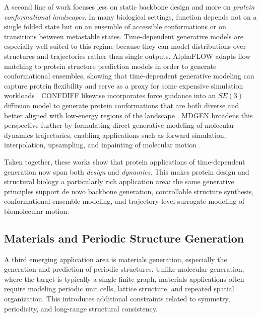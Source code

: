 \documentclass{article}
\begin{document}
A second line of work focuses less on static backbone design and more on \emph{protein conformational landscapes}. In many biological settings, function depends not on a single folded state but on an ensemble of accessible conformations or on transitions between metastable states. Time-dependent generative models are especially well suited to this regime because they can model distributions over structures and trajectories rather than single outputs. AlphaFLOW adapts flow matching to protein structure prediction models in order to generate conformational ensembles, showing that time-dependent generative modeling can capture protein flexibility and serve as a proxy for some expensive simulation workloads \cite{jing2024alphaflow}. CONFDIFF likewise incorporates force guidance into an $SE(3)$ diffusion model to generate protein conformations that are both diverse and better aligned with low-energy regions of the landscape \cite{wang2024confdiff}. MDGEN broadens this perspective further by formulating direct generative modeling of molecular dynamics trajectories, enabling applications such as forward simulation, interpolation, upsampling, and inpainting of molecular motion \cite{jing2024mdgen}.

Taken together, these works show that protein applications of time-dependent generation now span both \emph{design} and \emph{dynamics}. This makes protein design and structural biology a particularly rich application area: the same generative principles support de novo backbone generation, controllable structure synthesis, conformational ensemble modeling, and trajectory-level surrogate modeling of biomolecular motion.

\subsection{Materials and Periodic Structure Generation}
\label{sec:app_materials}

A third emerging application area is materials generation, especially the generation and prediction of periodic structures. Unlike molecular generation, where the target is typically a single finite graph, materials applications often require modeling periodic unit cells, lattice structure, and repeated spatial organization. This introduces additional constraints related to symmetry, periodicity, and long-range structural consistency.
\end{document}
